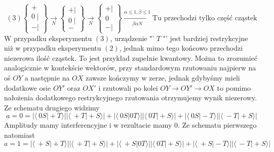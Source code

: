 \begin{equation*} (3)
	\left\{\begin{array}{lr}
		+ \\
		0 \hspace{3pt} \vert \\
		- \vert
	\end{array}\right\} 
	\xrightarrow[N]{}
	\left\{\begin{array}{lr}
		+ \vert \\
		0 \hspace{3pt} \vert \\
		- 
	\end{array}\right\}
	\xrightarrow[N]{}
	\left\{\begin{array}{lr}
		+ \vert \\
		0  \\
		- \vert
	\end{array}\right\}
	\xrightarrow[\beta\alpha N]{\alpha \leq 1, \beta \leq 1} \text{Tu przechodzi tylko część cząstek}
\end{equation*}
W przypadku eksperymentu $(3)$, urządzenie "' $T$ "' jest bardziej restrykcyjne niż w przypadku eksperymentu $(2)$, jednak mimo tego końcowo przechodzi niezerowa ilość cząstek. To jest przykład zupełnie kwantowy.
Można to zrozumieć analogicznie w kontekście wektorów, przy standardowym rzutowaniu najpierw na oś $OY$ a następnie na $OX$ zawsze kończymy w zerze, jednak gdybyśmy mieli dodatkowe osie $OY'$ oraz $OX'$ i rzutowali po kolei $OY \rightarrow OY' \rightarrow OX$ to pomimo nałożenia dodatkowego restrykcyjnego rzutowania otrzymujemy wynik niezerowy.
Ze schematu drugiego widzimy
\begin{equation*}
	a = 0 = \left|\langle\ 0S \vert +T \rangle \right| \left|\langle\ +T \vert +S \rangle \right| + 
	\left|\langle\ 0S \vert 0T \rangle \right| \left|\langle\ 0T \vert +S \rangle \right| + 
	\left|\langle\ 0S \vert -T \rangle \right| \left|\langle\ -T \vert +S \rangle \right|
\end{equation*}
Amplitudy mamy interferencyjne i w rezultacie mamy 0. Ze schematu pierwszego natomiast
\begin{equation*}
	a = 1 = \left|\langle\ +S \vert +T \rangle \right| \left|\langle\ +T \vert +S \rangle \right| + 
	\left|\langle\ +S \vert 0T \rangle \right| \left|\langle\ 0T \vert +S \rangle \right| + 
	\left|\langle\ +S \vert -T \rangle \right| \left|\langle\ -T \vert +S \rangle \right|
\end{equation*}
